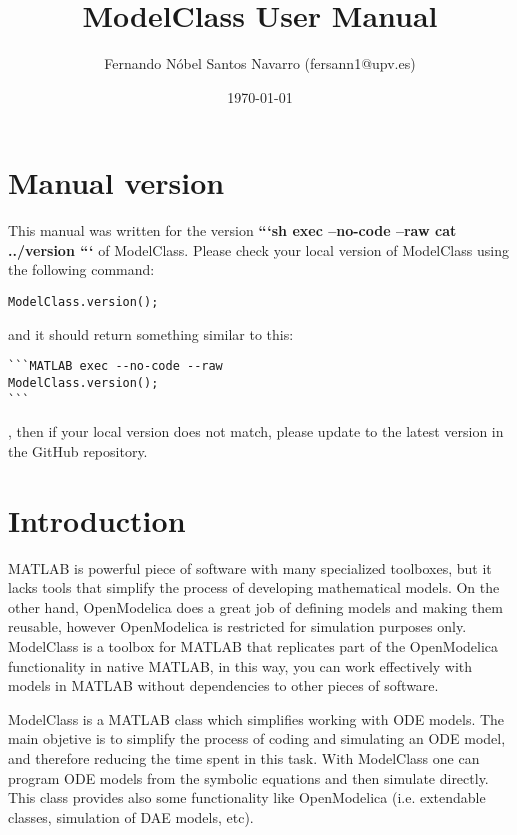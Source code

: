 \documentclass[11pt]{article}
\title{ModelClass User Manual}
\author{Fernando Nóbel Santos Navarro (fersann1@upv.es)}
\date{\today}
\begin{document}
\maketitle

\tableofcontents

\newpage 

\setlength{\parskip}{0.5em}

\section{Manual version}

This manual was written for the version \textbf{ 
```sh exec --no-code --raw
cat ../version
```
} of ModelClass. Please check your local version of ModelClass using the following command:

\begin{lstlisting}
ModelClass.version();
\end{lstlisting}

and it should return something similar to this:

\begin{lstlisting}
```MATLAB exec --no-code --raw
ModelClass.version();
```
\end{lstlisting}
, then if your local version does not match, please update to the latest version in the GitHub repository.

\section{Introduction}

MATLAB is powerful piece of software with many specialized toolboxes, but it lacks tools that simplify the process of developing mathematical models.
On the other hand, OpenModelica does a great job of defining models and making them reusable, however OpenModelica is restricted for simulation purposes only.
ModelClass is a toolbox for MATLAB that replicates part of the OpenModelica functionality in native MATLAB, in this way, you can work effectively with models in MATLAB without dependencies to other pieces of software.

ModelClass is a MATLAB class which simplifies working with ODE models. The main objetive is to simplify the process of coding and simulating an ODE model, and therefore reducing the time spent in this task. With ModelClass one can program ODE models from the symbolic equations and then simulate directly. This class provides also some functionality like OpenModelica (i.e. extendable classes, simulation of DAE models, etc).
\end{document}
